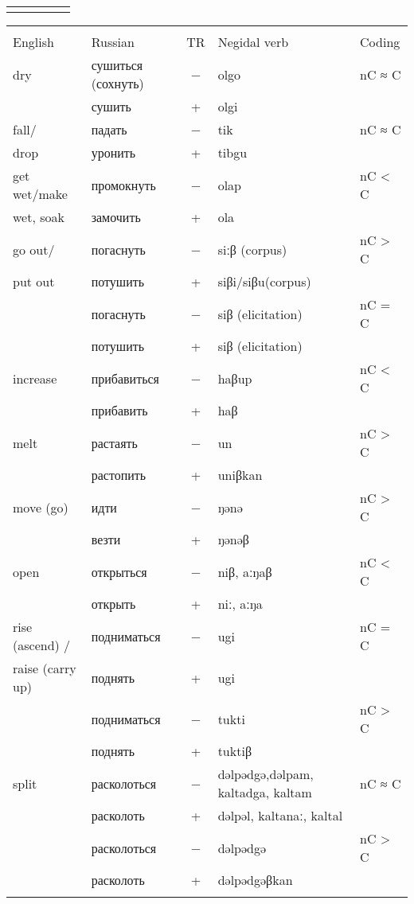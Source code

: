 \documentclass[output=paper,colorlinks,citecolor=brown]{langscibook}
\begin{document}
\begin{paperappendix}
\begin{table}[H]
\begin{tabularx}{\textwidth}{ l  l c Q l}
  \lspbottomrule
\end{tabularx}
\label{table:2Appendix2a}
\end{table}


\begin{table}[H]
\begin{tabularx}{\textwidth}{ l  l c Q l}
\lsptoprule
{} & \\\cmidrule(lr){1-2}
English  & Russian &	TR &	Negidal verb &	Coding\\
\midrule
dry &	сушиться (сохнуть) &	− &	olgo &	nC ≈ C\\
 &	сушить & 	+ &	olgi\\
\midrule
fall/  &	падать &	− &	tik &	nC ≈ C\\
 drop&	уронить &	+ &	tibgu &\\
\midrule
get wet/make &	промокнуть &	− &	olap &	nC < C\\
wet, soak &	замочить &	+ &	ola &\\
\midrule
go out/ &	погаснуть &	− &	siːβ (corpus) &	nC > C\\
 put out &	потушить &	+ &	siβi/siβu\newline (corpus) &\\
 &	погаснуть &	− &	siβ (elicitation) &	nC = C\\
 &	потушить &	+ &	siβ (elicitation) &	\\
\midrule
increase &	прибавиться &	− &	haβup &	nC < C\\
 &	прибавить &	+ &	haβ & 	\\
\midrule
melt &	растаять &	− &	un &	nC > C\\
 &	растопить &	+ &	uniβkan	 &\\
\midrule
move (go) &	идти &	− &	ŋənə &	nC > C\\
 &	везти &	+ &	ŋənəβ &	\\
\midrule
open &	открыться &	− &	niβ, aːŋaβ &	nC < C\\
 &	открыть &	+ &	niː, aːŋa &	\\
\midrule
rise (ascend) / &	подниматься &	− &	ugi &	nC = C\\
raise (carry up) &	поднять & 	+ &	ugi &	\\
\midrule
 &	подниматься &	− &	tukti &	nC > C\\
 &	поднять & 	+ &	tuktiβ &	\\
\midrule
split &	расколоться &	− &	dəlpədgə,\newline dəlpam, kaltadga, kaltam &	nC ≈ C\\
 &	расколоть & 	+ &	dəlpəl, kaltanaː, kaltal &	\\
 &	расколоться &	− &	dəlpədgə &	nC > C\\
 &	расколоть &	+ &	dəlpədgəβkan &	\\
  \lspbottomrule
\end{tabularx}
\label{table:2Appendix2b}
\end{table}



\end{paperappendix}
\end{document}
